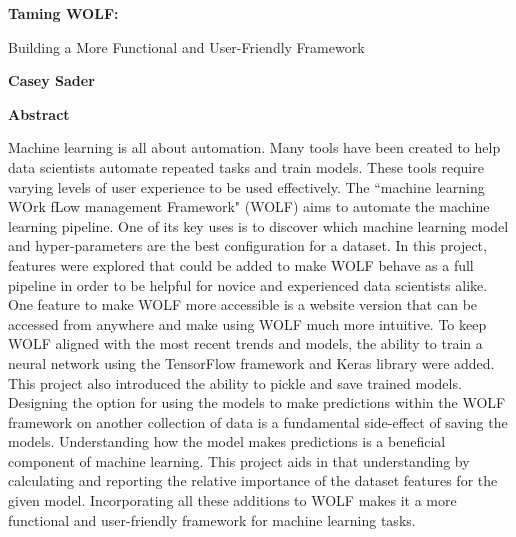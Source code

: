 \thispagestyle{plain}
\begin{center}
    \Large
    \textbf{Taming WOLF:}
    
    \vspace{0.4cm}
    \large
    Building a More Functional and User-Friendly Framework
    
    \vspace{0.4cm}
    \textbf{Casey Sader}
    
    \vspace{0.9cm}
    \textbf{Abstract}
\end{center}
Machine learning is all about automation. Many tools have been created to help data scientists automate repeated tasks and train models. These tools require varying levels of user experience to be used effectively. The ``machine learning WOrk fLow management Framework" (WOLF) aims to automate the machine learning pipeline. One of its key uses is to discover which machine learning model and hyper-parameters are the best configuration for a dataset. In this project, features were explored that could be added to make WOLF behave as a full pipeline in order to be helpful for novice and experienced data scientists alike. One feature to make WOLF more accessible is a website version that can be accessed from anywhere and make using WOLF much more intuitive. To keep WOLF aligned with the most recent trends and models, the ability to train a neural network using the TensorFlow framework and Keras library were added. This project also introduced the ability to pickle and save trained models. Designing the option for using the models to make predictions within the WOLF framework on another collection of data is a fundamental side-effect of saving the models. Understanding how the model makes predictions is a beneficial component of machine learning. This project aids in that understanding by calculating and reporting the relative importance of the dataset features for the given model. Incorporating all these additions to WOLF makes it a more functional and user-friendly framework for machine learning tasks.